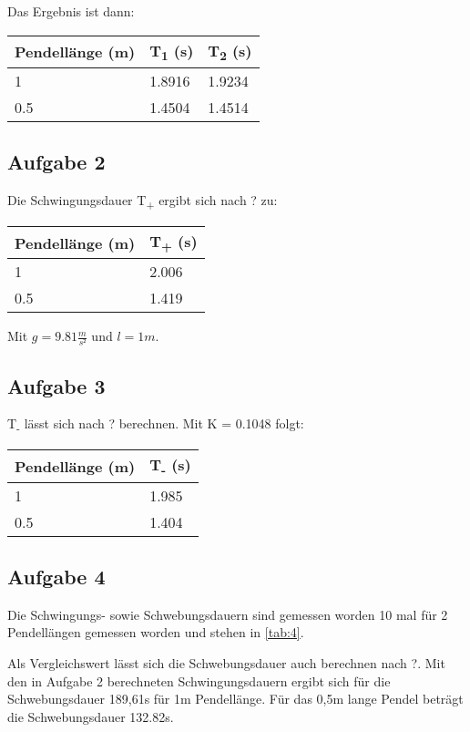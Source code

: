 \documentclass[titlepage=firstcover, captions=tableheading]{scrartcl}
\begin{document}
Das Ergebnis ist dann:

\begin{center}
    \begin{tabular}{lll}
        \toprule
        Pendellänge (m) & T\textsubscript{1} (s) & T\textsubscript{2} (s)\\
        \midrule 
        1 &1.8916 & 1.9234 \\
        0.5 & 1.4504 & 1.4514 \\
        \bottomrule
    \end{tabular}
\end{center}

\subsection{Aufgabe 2}

Die Schwingungsdauer T\textsubscript{+} ergibt sich nach ? zu: 

\begin{center}
    \begin{tabular}{ll}
        \toprule
        Pendellänge (m) & T\textsubscript{+} (s) \\
        \midrule 
        1 & 2.006 \\
        0.5 & 1.419 \\
        \bottomrule
    \end{tabular}
\end{center}
Mit $g=9.81\frac{m}{s²}$ und $l=1m$.

\subsection{Aufgabe 3}

T\textsubscript{-} lässt sich nach ? berechnen.
Mit K = 0.1048 folgt:
\begin{center}
    \begin{tabular}{ll}
        \toprule
        Pendellänge (m) & T\textsubscript{-} (s) \\
        \midrule 
        1 & 1.985 \\
        0.5 & 1.404 \\
        \bottomrule
    \end{tabular}
\end{center}

\subsection{Aufgabe 4}

Die Schwingungs- sowie Schwebungsdauern sind gemessen worden 10 mal für 2 Pendellängen gemessen worden und stehen in \ref{tab:4}.

Als Vergleichswert lässt sich die Schwebungsdauer auch berechnen nach ?.
Mit den in Aufgabe 2 berechneten Schwingungsdauern ergibt sich für die Schwebungsdauer 189,61s für 1m Pendellänge.
Für das 0,5m lange Pendel beträgt die Schwebungsdauer 132.82s.
\end{document}

